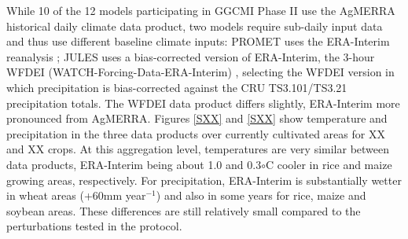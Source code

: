 \documentclass[gmd, manuscript]{copernicus} %
\begin{document}

While 10 of the 12 models participating in GGCMI Phase II use the AgMERRA historical daily climate data product, two models require sub-daily input data and thus use different baseline climate inputs:
PROMET uses the ERA-Interim reanalysis \citep{dee2011era}; JULES uses a bias-corrected version of ERA-Interim, the 3-hour WFDEI (WATCH-Forcing-Data-ERA-Interim) \citep{weedon2014wfdei}, selecting the WFDEI version in which precipitation is bias-corrected against the CRU TS3.101/TS3.21 precipitation totals\citep{harris_cru_2014}.
The WFDEI data product differs slightly, ERA-Interim more pronounced from  AgMERRA. Figures \ref{SXX} and \ref{SXX} show temperature and precipitation in the three data products over currently cultivated areas for XX and XX crops. At this aggregation level, temperatures are very similar between data products, ERA-Interim being about 1.0 and 0.3$\circ$C cooler in rice and maize growing areas, respectively. For precipitation, ERA-Interim is substantially wetter in wheat areas (+60mm year$^{-1}$) and also in some years for rice, maize and soybean areas.
These differences are still relatively small compared to the perturbations tested in the protocol.
\end{document}
